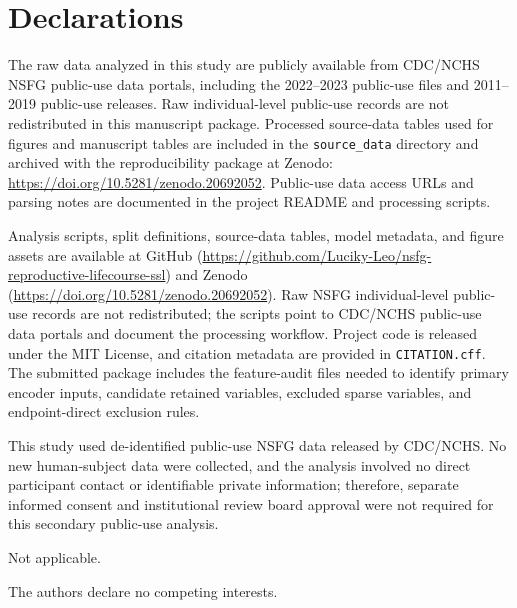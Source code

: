 \documentclass[referee,pdflatex,sn-basic,Numbered]{sn-jnl}
\begin{document}
\backmatter

\section*{Declarations}


The raw data analyzed in this study are publicly available from CDC/NCHS NSFG public-use data portals, including the 2022--2023 public-use files and 2011--2019 public-use releases. Raw individual-level public-use records are not redistributed in this manuscript package. Processed source-data tables used for figures and manuscript tables are included in the \texttt{source\_data} directory and archived with the reproducibility package at Zenodo: \url{https://doi.org/10.5281/zenodo.20692052}. Public-use data access URLs and parsing notes are documented in the project README and processing scripts.


Analysis scripts, split definitions, source-data tables, model metadata, and figure assets are available at GitHub (\url{https://github.com/Luciky-Leo/nsfg-reproductive-lifecourse-ssl}) and Zenodo (\url{https://doi.org/10.5281/zenodo.20692052}). Raw NSFG individual-level public-use records are not redistributed; the scripts point to CDC/NCHS public-use data portals and document the processing workflow. Project code is released under the MIT License, and citation metadata are provided in \texttt{CITATION.cff}. The submitted package includes the feature-audit files needed to identify primary encoder inputs, candidate retained variables, excluded sparse variables, and endpoint-direct exclusion rules.


This study used de-identified public-use NSFG data released by CDC/NCHS. No new human-subject data were collected, and the analysis involved no direct participant contact or identifiable private information; therefore, separate informed consent and institutional review board approval were not required for this secondary public-use analysis.


Not applicable.


The authors declare no competing interests.

\end{document}
